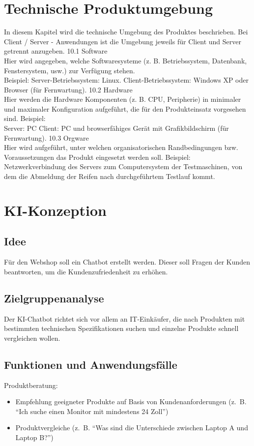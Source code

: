 \documentclass[%
	12pt,
	a4paper,
	oneside,
	parskip=full
]{scrbook}
\begin{document}
\chapter{Technische Produktumgebung}
In diesem Kapitel wird die technische Umgebung des Produktes beschrieben. Bei Client /
Server - Anwendungen ist die Umgebung jeweils für Client und Server getrennt anzugeben.
10.1 Software\\
Hier wird angegeben, welche Softwaresysteme (z. B. Betriebssystem, Datenbank,
Fenstersystem, usw.) zur Verfügung stehen.\\
Beispiel:
Server-Betriebssystem: Linux.
Client-Betriebssystem: Windows XP oder Browser (für Fernwartung).
10.2 Hardware \\
Hier werden die Hardware Komponenten (z. B. CPU, Peripherie) in minimaler und maximaler
Konfiguration aufgeführt, die für den Produkteinsatz vorgesehen sind.
Beispiel:\\
Server: PC
Client: PC und browserfähiges Gerät mit Grafikbildschirm (für Fernwartung).
10.3 Orgware\\
Hier wird aufgeführt, unter welchen organisatorischen Randbedingungen bzw.
Voraussetzungen das Produkt eingesetzt werden soll.
Beispiel:\\
Netzwerkverbindung des Servers zum Computersystem der Testmaschinen, von dem die
Abmeldung der Reifen nach durchgeführtem Testlauf kommt.

\chapter{KI-Konzeption}
\section{Idee}
Für den Webshop soll ein Chatbot erstellt werden. 
Dieser soll Fragen der Kunden beantworten, um die Kundenzufriedenheit zu erhöhen.
\section{Zielgruppenanalyse}
Der KI-Chatbot richtet sich vor allem an IT-Einkäufer, die nach Produkten mit bestimmten technischen Spezifikationen suchen und einzelne Produkte schnell vergleichen wollen.
\section{Funktionen und Anwendungsfälle}
Produktberatung:
\begin{itemize}
	\item Empfehlung geeigneter Produkte auf Basis von Kundenanforderungen (z.~B. \enquote{Ich suche einen Monitor mit mindestens 24 Zoll})
	\item Produktvergleiche (z.~B. \enquote{Was sind die Unterschiede zwischen Laptop A und Laptop B?})
\end{itemize}
\end{document}
